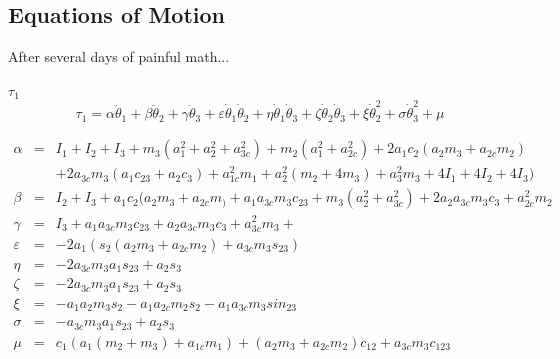 \documentclass{beamer}
\begin{document}
\subsection{Equations of Motion}
\begin{frame}{After several days of painful math...}
\begin{exampleblock}{$\tau_1$}
\[
\tau_1 = \alpha \ddot{\theta}_1 + \beta \ddot{\theta}_2 + \gamma \ddot{\theta}_3 + \varepsilon \dot{\theta}_1 \dot{\theta}_2 + \eta \dot{\theta}_1 \dot{\theta}_3 + \zeta \dot{\theta}_2 \dot{\theta}_3 + \xi \dot{\theta}_2^2 + \sigma \dot{\theta}_3^2 + \mu
\]
\end{exampleblock}

\tiny
\begin{eqnarray*}
\alpha & = & I_1 + I_2 + I_3 + m_3 (a_1^2+a_2^2+a_{3c}^2)+m_2(a_1^2+a_{2c}^2)+2a_1c_2(a_2 m_3+a_{2c}m_2)\\
& & +2a_{3c}m_3(a_1c_{23}+a_2c_3)+a_{1c}^2 m_1 + a_2^2 (m_2+4 m_3)+a_3^2 m_3+4 I_1+4 I_2+4 I_3 )\\
\beta & = & I_2 + I_3 + a_1c_2( a_2m_3+a_{2c}m_)+ a_1a_{3c} m_3 c_{23}+m_3(a_2^2+a_{3c}^2)+2a_2a_{3c} m_3c_3+a_{2c}^2 m_2\\
\gamma & = & I_3 + a_1 a_{3c} m_3 c_{23} + a_2 a_{3c} m_3c_3 +a_{3c}^2 m_3+\\
\varepsilon & = & -2 a_1(s_2 (a_2 m_3+a_{2c} m_2)+a_{3c} m_3 s_{23})\\
\eta & = & -2 a_{3c} m_3 a_1 s_{23}+a_2 s_3\\
\zeta & = & -2 a_{3c} m_3 a_1 s_{23} +a_2 s_3 \\
\xi & = & -a_1 a_2 m_3 s_2 - a_1 a_{2c} m_2 s_2 -a_1 a_{3c} m_3 sin_{23}\\
\sigma & = & -a_{3c} m_3 a_1 s_{23}+a_2 s_3\\
\mu & = & c_1 (a_1(m_2+m_3)+a_{1c} m_1)+(a_2 m_3+a_{2c} m_2) c_{12} +a_{3c}m_3c_{123}\\
\end{eqnarray*}
\end{frame}
\end{document}
